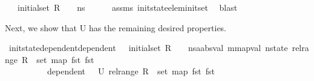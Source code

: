 \begin{isabellebody}
\ \ \ {\isachardoublequoteopen}initial{\isacharunderscore}{\kern0pt}set\ R\ {\isasymLambda}\ {\isasymLambda}{\isacharprime}{\kern0pt}\ {\isasymOmega}\ ns\ {\isasymnoteq}\ {\isacharbraceleft}{\kern0pt}{\isacharbraceright}{\kern0pt}{\isachardoublequoteclose}\isanewline
%
\isadelimproof
\ \ %
\endisadelimproof
%
\isatagproof
{}\isamarkupfalse%
\ assms\ init{\isacharunderscore}{\kern0pt}state{\isacharunderscore}{\kern0pt}elem{\isacharunderscore}{\kern0pt}init{\isacharunderscore}{\kern0pt}set\ \isamarkupfalse%
\ blast%
\endisatagproof
{\isafoldproof}%
%
\isadelimproof
%
\endisadelimproof
%
\begin{isamarkuptext}%
Next, we show that U has the remaining desired properties.%
\end{isamarkuptext}\isamarkuptrue%
\isamarkupfalse%
\ init{\isacharunderscore}{\kern0pt}state{\isacharunderscore}{\kern0pt}dependent{\isacharcolon}{\kern0pt}{\isachardoublequoteopen}dependent\ {\isasymLambda}{\isacharprime}{\kern0pt}\ {\isasymOmega}\ {\isacharparenleft}{\kern0pt}initial{\isacharunderscore}{\kern0pt}set\ R\ {\isasymLambda}\ {\isasymLambda}{\isacharprime}{\kern0pt}\ {\isasymOmega}\ {\isacharparenleft}{\kern0pt}ns{\isacharcolon}{\kern0pt}{\isacharcolon}{\kern0pt}{\isacharparenleft}{\kern0pt}{\isacharprime}{\kern0pt}a{\isacharcolon}{\kern0pt}{\isacharcolon}{\kern0pt}absval{\isacharcomma}{\kern0pt}\ {\isacharprime}{\kern0pt}m{\isacharcolon}{\kern0pt}{\isacharcolon}{\kern0pt}mapval{\isacharparenright}{\kern0pt}\ nstate{\isacharparenright}{\kern0pt}{\isacharparenright}{\kern0pt}\ {\isacharparenleft}{\kern0pt}{\isacharparenleft}{\kern0pt}rel{\isacharunderscore}{\kern0pt}range\ R{\isacharparenright}{\kern0pt}\ {\isasymunion}\ set\ {\isacharparenleft}{\kern0pt}map\ fst\ {\isacharparenleft}{\kern0pt}fst\ {\isasymLambda}{\isacharparenright}{\kern0pt}{\isacharparenright}{\kern0pt}{\isacharparenright}{\kern0pt}{\isachardoublequoteclose}\ \isanewline
\ \ \ \ \ \ \ \ \ {\isacharparenleft}{\kern0pt}\ {\isachardoublequoteopen}dependent\ {\isasymLambda}{\isacharprime}{\kern0pt}\ {\isasymOmega}\ {\isacharquery}{\kern0pt}U\ {\isacharparenleft}{\kern0pt}{\isacharparenleft}{\kern0pt}rel{\isacharunderscore}{\kern0pt}range\ R{\isacharparenright}{\kern0pt}\ {\isasymunion}\ set\ {\isacharparenleft}{\kern0pt}map\ fst\ {\isacharparenleft}{\kern0pt}fst\ {\isasymLambda}{\isacharparenright}{\kern0pt}{\isacharparenright}{\kern0pt}{\isacharparenright}{\kern0pt}\ {\isachardoublequoteclose}{\isacharparenright}{\kern0pt}\isanewline
%
\isadelimproof

\end{isabellebody}
